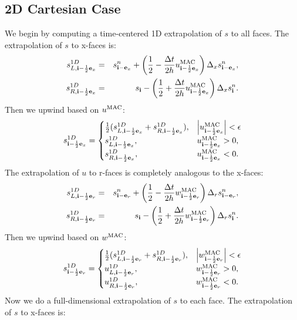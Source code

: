 \documentclass[11pt]{article}
\def\half  {\frac{1}{2}}
\def\dt    {\Delta t}
\def\mac   {\rm MAC}
\def\eb    {{\bf e}}
\def\ib    {{\bf i}}
\begin{document}
\subsection{2D Cartesian Case}
We begin by computing a time-centered 1D extrapolation of $s$ to all faces.  The extrapolation of $s$ to x-faces is:
\begin{eqnarray}
s_{L,\ib-\half\eb_x}^{1D} &=& s_{\ib-\eb_x}^n + \left(\half - \frac{\dt}{2h}u_{\ib-\half\eb_x}^{\mac}\right)\Delta_x s_{\ib-\eb_x}^n, \\
s_{R,\ib-\half\eb_x}^{1D} &=& s_{\ib} - \left(\half + \frac{\dt}{2h}u_{\ib-\half\eb_x}^{\mac}\right)\Delta_x s_{\ib}^n.
\end{eqnarray}
Then we upwind based on $u^{\mac}$:
\begin{equation}
s_{\ib-\half\eb_x}^{1D} =
\begin{cases}
\half(s_{L,\ib-\half\eb_x}^{1D} + s_{R,\ib-\half\eb_x}^{1D}), & \left|u^{\mac}_{\ib-\half\eb_x}\right| < \epsilon \\
s_{L,\ib-\half\eb_x}^{1D}, & u^{\mac}_{\ib-\half\eb_x} > 0, \\
s_{R,\ib-\half\eb_x}^{1D}, & u^{\mac}_{\ib-\half\eb_x} < 0. \\
\end{cases}
\end{equation}
The extrapolation of $u$ to r-faces is completely analogous to the x-faces:
\begin{eqnarray}
s_{L,\ib-\half\eb_r}^{1D} &=& s_{\ib-\eb_r}^n + \left(\half - \frac{\dt}{2h}w_{\ib-\half\eb_r}^{\mac}\right)\Delta_r s_{\ib-\eb_r}^n, \\
s_{R,\ib-\half\eb_r}^{1D} &=& s_{\ib} - \left(\half + \frac{\dt}{2h}w_{\ib-\half\eb_r}^{\mac}\right)\Delta_r s_{\ib}^n.
\end{eqnarray}
Then we upwind based on $w^{\mac}$:
\begin{equation}
s_{\ib-\half\eb_r}^{1D} =
\begin{cases}
\half(s_{L,\ib-\half\eb_r}^{1D} + s_{R,\ib-\half\eb_r}^{1D}), & \left|w^{\mac}_{\ib-\half\eb_r}\right| < \epsilon \\
u_{L,\ib-\half\eb_r}^{1D}, & w^{\mac}_{\ib-\half\eb_r} > 0, \\
u_{R,\ib-\half\eb_r}^{1D}, & w^{\mac}_{\ib-\half\eb_r} < 0. \\
\end{cases}
\end{equation}
Now we do a full-dimensional extrapolation of $s$ to each face.  The extrapolation of $s$ to x-faces is:
\end{document}
